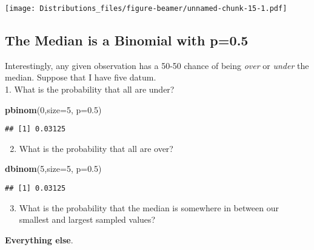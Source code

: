 \documentclass[ignorenonframetext,]{beamer}
\newenvironment{Shaded}{\begin{snugshade}}{\end{snugshade}}
\newcommand{\DataTypeTok}[1]{\textcolor[rgb]{0.13,0.29,0.53}{#1}}
\newcommand{\DecValTok}[1]{\textcolor[rgb]{0.00,0.00,0.81}{#1}}
\newcommand{\FloatTok}[1]{\textcolor[rgb]{0.00,0.00,0.81}{#1}}
\newcommand{\KeywordTok}[1]{\textcolor[rgb]{0.13,0.29,0.53}{\textbf{#1}}}
\newcommand{\NormalTok}[1]{#1}
\providecommand{\tightlist}{%
  \setlength{\itemsep}{0pt}\setlength{\parskip}{0pt}}
\begin{document}
\texttt{[image: Distributions\_files/figure-beamer/unnamed-chunk-15-1.pdf]}

\hypertarget{the-median-is-a-binomial-with-p0.5}{%
\subsection{The Median is a Binomial with
p=0.5}\label{the-median-is-a-binomial-with-p0.5}}

Interestingly, any given observation has a 50-50 chance of being
\emph{over} or \emph{under} the median. Suppose that I have five
datum.\\
1. What is the probability that all are under?

\begin{Shaded}
\begin{Highlighting}[]
\KeywordTok{pbinom}\NormalTok{(}\DecValTok{0}\NormalTok{,}\DataTypeTok{size=}\DecValTok{5}\NormalTok{, }\DataTypeTok{p=}\FloatTok{0.5}\NormalTok{)}
\end{Highlighting}
\end{Shaded}

\begin{verbatim}
## [1] 0.03125
\end{verbatim}

\begin{enumerate}[<+->]
\setcounter{enumi}{1}
\tightlist
\item
  What is the probability that all are over?
\end{enumerate}

\begin{Shaded}
\begin{Highlighting}[]
\KeywordTok{dbinom}\NormalTok{(}\DecValTok{5}\NormalTok{,}\DataTypeTok{size=}\DecValTok{5}\NormalTok{, }\DataTypeTok{p=}\FloatTok{0.5}\NormalTok{)}
\end{Highlighting}
\end{Shaded}

\begin{verbatim}
## [1] 0.03125
\end{verbatim}

\begin{enumerate}[<+->]
\setcounter{enumi}{2}
\tightlist
\item
  What is the probability that the median is somewhere in between our
  smallest and largest sampled values?
\end{enumerate}

\textbf{Everything else}.
\end{document}
